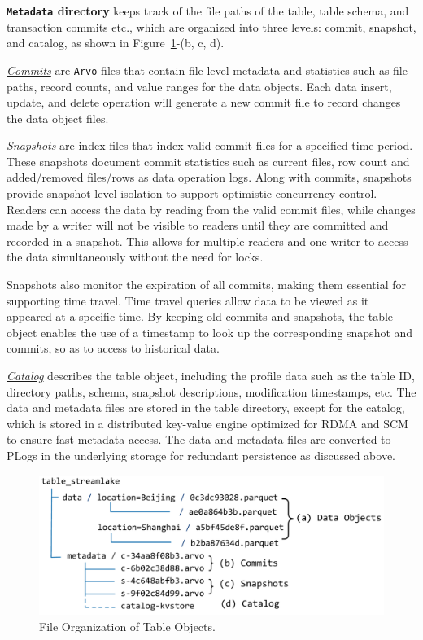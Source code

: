 \noindent \textbf{\texttt{Metadata} directory}  keeps track of the file paths of the table, table schema,  and transaction commits etc., which are organized into three levels: commit, snapshot, and catalog, as shown in Figure~\ref{fig:tableobject}-(b, c, d).

 \noindent \underline{\textit{Commits}} are \texttt{Arvo} files that contain file-level metadata and statistics such as file paths, record counts, and value ranges for the data objects. Each data insert, update, and delete operation will generate a new commit file to record changes  the data object files.


\noindent \underline{\textit{Snapshots}} are index files that index  valid commit files for a specified time period. These snapshots document commit statistics such as current files, row count and added/removed files/rows as data operation logs. Along with commits, snapshots provide snapshot-level isolation to support optimistic concurrency control. Readers can access the data by reading from the valid commit files, while changes made by a writer will not be visible to readers until they are committed and recorded in a snapshot. This allows for multiple readers and one writer to access the data simultaneously without the need for locks. 

Snapshots also monitor the expiration of all commits, making them essential for supporting time travel. Time travel queries allow data to be viewed as it appeared at a specific time. By keeping old commits and snapshots, the table object enables the use of a timestamp to look up the corresponding snapshot and commits, so as to access to historical data.

\noindent \underline{\textit{Catalog}}  describes the table object, including the profile data  such as the table ID, directory paths, schema, snapshot descriptions, modification timestamps, etc. The data and metadata files are stored in the table directory, except for the catalog, which is stored in a distributed key-value engine optimized for RDMA and SCM to ensure fast metadata access. The data and metadata files are converted to PLogs in the underlying storage for redundant persistence as discussed above.



\begin{figure}[htbp]
	
	\includegraphics[scale=0.3]{figures/tableobjects}
	\centering
	\vspace{-1em}
	\caption{File Organization of \sys Table Objects.}
	\label{fig:tableobject}
	\vspace{-1em}
\end{figure}


















